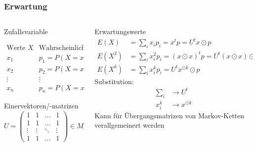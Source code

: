 %
%
%
\bgroup
\begin{frame}[t]
\setlength{\abovedisplayskip}{5pt}
\setlength{\belowdisplayskip}{5pt}
\frametitle{Erwartung}
\vspace{-20pt}
\begin{columns}[t,onlytextwidth]
\begin{column}{0.48\textwidth}
\begin{block}{Zufallsvariable}
\begin{center}
\[
\begin{array}{c|c}
\text{Werte $X$}&\text{Wahrscheinlichkeit $p$}\\
\hline
x_1&p_1=P(X=x_1)\\
x_2&p_2=P(X=x_2)\\
\vdots&\vdots\\
x_n&p_n=P(X=x_n)
\end{array}
\]
\end{center}
\end{block}
\begin{block}{Einervektoren/-matrizen}
\[
U=\begin{pmatrix}
1&1&\dots&1\\
1&1&\dots&1\\
\vdots&\vdots&\ddots&\vdots\\
1&1&\dots&1
\end{pmatrix}
\in
M_{n\times m}(\Bbbk)
\]
\end{block}
\end{column}
\begin{column}{0.48\textwidth}
\begin{block}{Erwartungswerte}
\begin{align*}
E(X)
&=
\sum_i x_ip_i
=
x^tp
=
U^t x\odot p
\\
E(X^2)
&=
\sum_i x_i^2p_i
=
(x\odot x)^tp
=
U^t (x\odot x) \odot p
\\
E(X^k)
&=
\sum_i x_i^kp_i
=
U^t x^{\odot k}\odot p
\end{align*}
Substitution:
\begin{align*}
\sum_i &\to U^t\\
x_i^k &\to x^{\odot k}
\end{align*}
Kann für Übergangsmatrizen von Markov-Ketten verallgemeinert werden
\end{block}
\end{column}
\end{columns}
\end{frame}
\egroup
